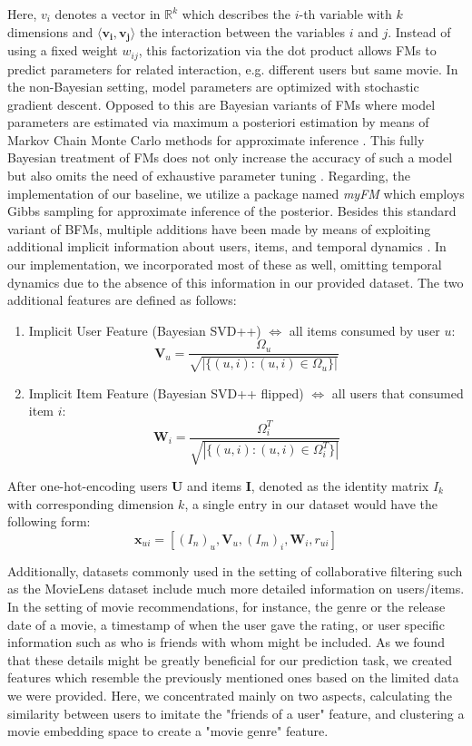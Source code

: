\documentclass[10pt,conference,compsocconf]{IEEEtran}
\begin{document}
    Here, $v_i$ denotes a vector in $\mathbb{R}^k$ which describes the $i$-th variable with $k$ dimensions and $\langle \mathbf{v_i},\mathbf{v_j} \rangle$ the interaction between the variables $i$ and $j$.
    Instead of using a fixed weight $w_{ij}$, this factorization via the dot product allows FMs to predict parameters for related interaction, e.g. different users but same movie.
    In the non-Bayesian setting, model parameters are optimized with stochastic gradient descent.
    Opposed to this are Bayesian variants of FMs where model parameters are estimated via maximum a posteriori estimation by means of Markov Chain Monte Carlo methods for approximate inference \cite{salakhutdinov_bayesian_2008}.
    This fully Bayesian treatment of FMs does not only increase the accuracy of such a model but also omits the need of exhaustive parameter tuning \cite{freudenthaler_bayesian_2011}.
    Regarding, the implementation of our baseline, we utilize a package named \textit{myFM} \cite{noauthor_myfm_nodate} which employs Gibbs sampling for approximate inference of the posterior.
    Besides this standard variant of BFMs, multiple additions have been made by means of exploiting additional implicit information about users, items, and temporal dynamics \cite{rendle_scaling_2013,koren_factorization_2008,koren_collaborative_2009}.
    In our implementation, we incorporated most of these as well, omitting temporal dynamics due to the absence of this information in our provided dataset.
    The two additional features are defined as follows:
    \begin{enumerate}
        \item Implicit User Feature (Bayesian SVD++) $\Leftrightarrow$ all items consumed by user $u$:
        $$\mathbf{V}_u=\frac{\Omega_u}{\sqrt{|\{(u,i): (u,i) \in \Omega_u\}|}}$$
        \item Implicit Item Feature (Bayesian SVD++ flipped) $\Leftrightarrow$ all users that consumed item $i$:
        $$\mathbf{W}_i=\frac{\Omega^T_i}{\sqrt{|\{(u,i): (u,i) \in \Omega^T_i\}|}}$$
    \end{enumerate}
    After one-hot-encoding users $\mathbf{U}$ and items $\mathbf{I}$, denoted as the identity matrix $I_k$ with corresponding dimension $k$, a single entry in our dataset would have the following form:
    $$\mathbf{x}_{ui} = [(I_n)_u,\mathbf{V}_u,(I_m)_i,\mathbf{W}_i, r_{ui}]$$

    Additionally, datasets commonly used in the setting of collaborative filtering such as the MovieLens dataset include much more detailed information on users/items.
    In the setting of movie recommendations, for instance, the genre or the release date of a movie, a timestamp of when the user gave the rating, or user specific information such as who is friends with whom might be included.
    As we found that these details might be greatly beneficial for our prediction task, we created features which resemble the previously mentioned ones based on the limited data we were provided.
    Here, we concentrated mainly on two aspects, calculating the similarity between users to imitate the "friends of a user" feature, and clustering a movie embedding space to create a "movie genre" feature.
\end{document}
